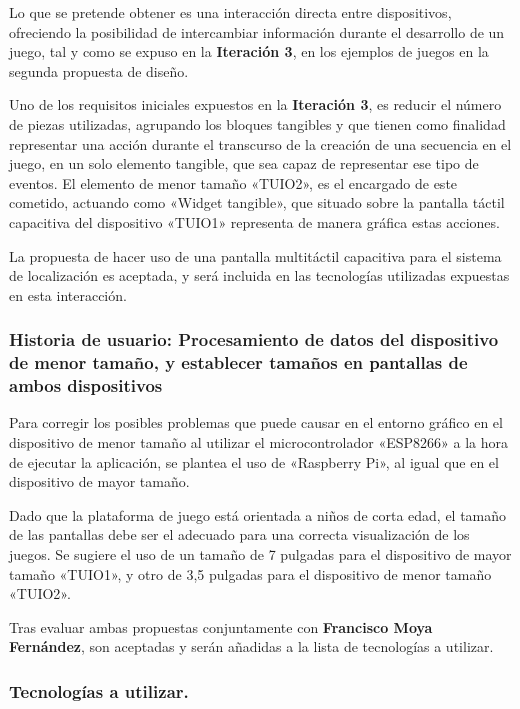 Lo que se pretende obtener es una interacción directa entre dispositivos, ofreciendo la posibilidad de intercambiar información durante el desarrollo de un juego, tal y como se expuso en la \textbf{Iteración 3}, en los ejemplos de juegos en la segunda propuesta de diseño.

Uno de los requisitos iniciales expuestos en la \textbf{Iteración 3}, es reducir el número de piezas utilizadas, agrupando los bloques tangibles y que tienen como finalidad representar una acción durante el transcurso de la creación de una secuencia en el juego, en un solo elemento tangible, que sea capaz de representar ese tipo de eventos. El elemento de menor tamaño «TUIO2», es el encargado de este cometido, actuando como «Widget tangible», que situado sobre la pantalla táctil capacitiva del dispositivo «TUIO1» representa de manera gráfica estas acciones.

La propuesta de hacer uso de una pantalla multitáctil capacitiva para el sistema de localización es aceptada, y será incluida en las tecnologías utilizadas expuestas en esta interacción.

\subsubsection{Historia de usuario: Procesamiento de datos del dispositivo de menor tamaño, y establecer tamaños en pantallas de ambos dispositivos }

Para corregir los posibles problemas que puede causar en el entorno gráfico en el dispositivo de menor tamaño al utilizar el microcontrolador «ESP8266» a la hora de ejecutar la aplicación, se plantea el uso de «Raspberry Pi», al igual que en el dispositivo de mayor tamaño.\

Dado que la plataforma de juego está orientada a niños de corta edad, el tamaño de las pantallas debe ser el adecuado para una correcta visualización de los juegos. Se sugiere el uso de un tamaño de 7 pulgadas para el dispositivo de mayor tamaño «TUIO1», y otro de 3,5 pulgadas para el dispositivo de menor tamaño «TUIO2».

Tras evaluar ambas propuestas conjuntamente con \textbf{Francisco Moya Fernández}, son aceptadas y serán añadidas a la lista de tecnologías a utilizar.


\subsubsection{Tecnologías a utilizar.}

